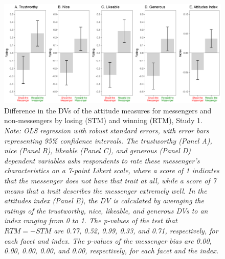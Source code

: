 \renewcommand{\baselinestretch}{1.25}%
\begin{figure}[!t]%
  \centering
  \includegraphics[width=1.0\textwidth]{figures/study1_attitude_list.png}
  \caption{Difference in the DVs of the attitude measures for messengers and non-messengers 
                                              by losing (STM) and winning (RTM), Study 1. 
  \textit{Note: OLS regression with robust standard errors, with error bars representing 95\% confidence intervals. The trustworthy (Panel A), nice (Panel B), likeable (Panel C), and generous (Panel D) dependent variables asks respondents to rate these messenger's characteristics on a 7-point Likert scale, where a score of 1 indicates that the messenger does not have that trait at all, while a score of 7 means that a trait describes the messenger extremely well.
    In the attitudes index (Panel E), the DV is calculated by averaging the ratings of the trustworthy, nice, likeable, and generous DVs to an index ranging from 0 to 1. The p-values of the test that $RTM = -STM$ are 0.77, 0.52, 0.99, 0.33, and 0.71, respectively, for each facet and index. The p-values of the messenger bias are 0.00, 0.00, 0.00, 0.00, and 0.00, respectively, for each facet and the index.}}
  \label{fig:attitude_list}
\end{figure}%
\renewcommand{\baselinestretch}{1.67}%

